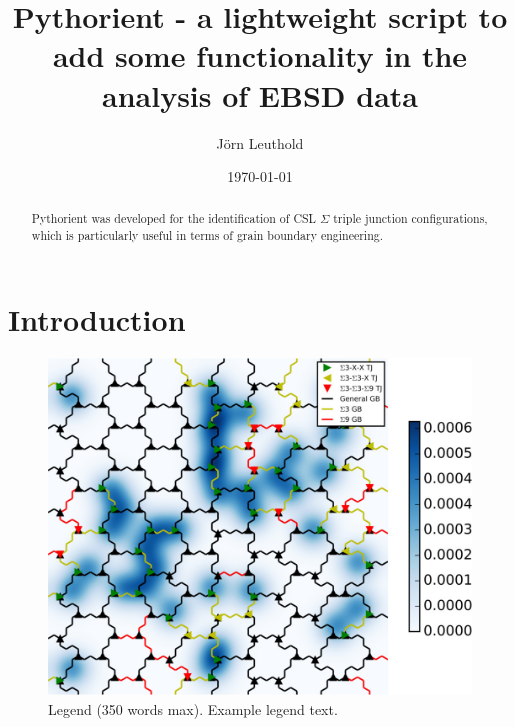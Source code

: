 \documentclass{article}
\title{Pythorient - a lightweight script to add some functionality in the analysis of EBSD data}
\author{J\"orn Leuthold}
\date{\today}
\begin{document}
\maketitle


\begin{abstract}
Pythorient was developed for the identification of CSL $\Sigma$ triple junction configurations, which is particularly useful in terms of grain boundary engineering.  


\end{abstract}

\section{Introduction}
\begin{figure}[ht]
\centering
\includegraphics[width=\linewidth]{figs/Generated_OIM}
\caption{Legend (350 words max). Example legend text.}
\label{fig:stream}
\end{figure}
\end{document}
